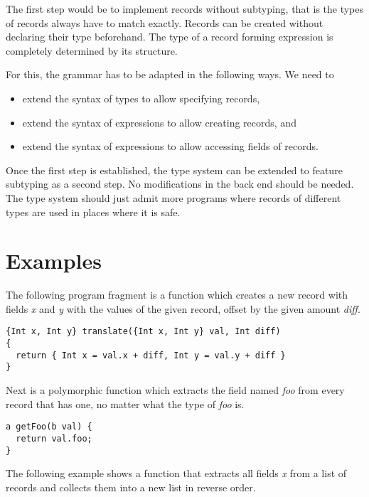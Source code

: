 \documentclass[a4paper]{article}
\begin{document}
The first step would be to implement records without subtyping, that is the
types of records always have to match exactly.  Records can be created without
declaring their type beforehand.  The type of a record forming expression is
completely determined by its structure.

For this, the grammar has to be adapted in the following ways. We need to

\begin{itemize}

  \item extend the syntax of types to allow specifying records,

  \item extend the syntax of expressions to allow creating records, and

  \item extend the syntax of expressions to allow accessing fields of records.
  
\end{itemize}

Once the
first step is established, the type system can be extended to feature subtyping
as a second step.  No modifications in the back end should be needed.  The type
system should just admit more programs where records of different types are used
in places where it is safe.

\section{Examples}

The following program fragment is a function which creates a new record with
fields \emph{x} and \emph{y} with the values of the given record, offset by the
given amount \emph{diff}.

\begin{verbatim}
{Int x, Int y} translate({Int x, Int y} val, Int diff)
{
  return { Int x = val.x + diff, Int y = val.y + diff }
}
\end{verbatim}

Next is a polymorphic function which extracts the field named \emph{foo} from
every record that has one, no matter what the type of \emph{foo} is.

\begin{verbatim}
a getFoo(b val) {
  return val.foo;
}
\end{verbatim}

The following example shows a function that extracts all fields \emph{x} from a
list of records and collects them into a new list in reverse order.
\end{document}
